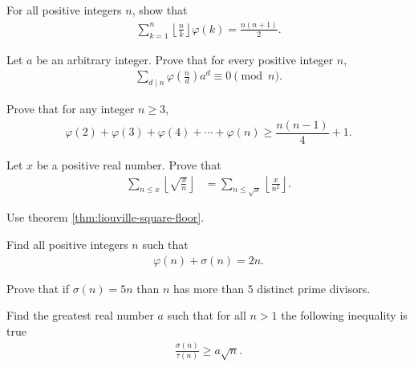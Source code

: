 \documentclass[12pt]{subfile}
\begin{document}
	\begin{problem}
		For all positive integers $n$, show that
			\begin{align*}
				\sum_{k=1}^n \left\lfloor \frac{n}{k} \right\rfloor \varphi(k) = \frac{n(n+1)}{2}.
			\end{align*}
	\end{problem}

	\begin{problem}
		Let $a$ be an arbitrary integer. Prove that for every positive integer $n$,
			\begin{align*}
				\sum_{d \mid n}\varphi\left(\frac{n}{d}\right)a^d\equiv0\pmod{n}.
			\end{align*}
	\end{problem}

	\begin{problem}
		Prove that for any integer $n \geq 3$,
			\begin{align*}
				\varphi(2)+\varphi(3)+\varphi(4)+\cdots+\varphi(n)\ge\dfrac{n(n-1)}{4}+1.
			\end{align*}
	\end{problem}

	\begin{problem}
		Let $x$ be a positive real number. Prove that
			\begin{align*}
				\sum_{n \leq x} \left\lfloor \sqrt{\frac{x}{n}} \right\rfloor &= \sum_{n\leq\sqrt x} \left\lfloor \frac{x}{n^2} \right\rfloor.
			\end{align*}
	\end{problem}

	\begin{hint}
		Use theorem \ref{thm:liouville-square-floor}.
	\end{hint}

	\begin{problem} %
		Find all positive integers $n$ such that
			\begin{align*}
				\varphi(n) + \sigma(n) = 2n.
			\end{align*}
	\end{problem}

	\begin{problem} %
		Prove that if $\sigma(n)=5n$ than $n$ has more than $5$ distinct prime divisors.
	\end{problem}

	\begin{problem}[Belarus 2010] %
		Find the greatest real number $a$ such that for all $n>1$ the following inequality is true
			\begin{align*}
				\frac{\sigma (n)}{\tau (n)}\geq a\sqrt{n}.
			\end{align*}
	\end{problem}
\end{document}
